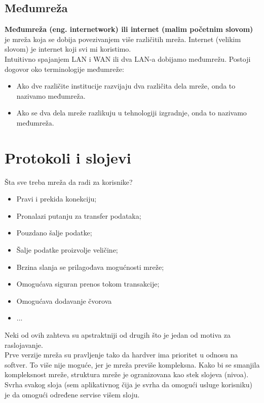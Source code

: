 \documentclass[a4paper]{article}
\begin{document}
    \subsection{Međumreža}
        \textbf{Međumreža (eng. internetwork) ili internet (malim početnim slovom)} je mreža koja
        se dobija povezivanjem više različitih mreža. Internet (velikim slovom) je internet 
        koji svi mi koristimo. \\
        \indent Intuitivno spajanjem LAN i WAN ili dva LAN-a dobijamo međumrežu. 
        Postoji dogovor oko terminologije međumreže:
        \begin{itemize}
            \item Ako dve različite institucije razvijaju dva različita dela mreže, 
                  onda to nazivamo međumreža. 
            \item Ako se dva dela mreže razlikuju u tehnologiji izgradnje, onda to nazivamo međumreža.
        \end{itemize} 

\section{Protokoli i slojevi}
    Šta sve treba mreža da radi za korisnike?
    \begin{itemize}
        \item Pravi i prekida konekciju;
        \item Pronalazi putanju za transfer podataka;
        \item Pouzdano šalje podatke;
        \item Šalje podatke proizvolje veličine;
        \item Brzina slanja se prilagođava mogućnosti mreže;
        \item Omogućava siguran prenos tokom transakcije;
        \item Omogućava dodavanje čvorova
        \item ...
    \end{itemize}
    Neki od ovih zahteva su apstraktniji od drugih što je jedan od motiva za raslojavanje.\\
    \indent Prve verzije mreža su pravljenje tako da hardver ima prioritet u odnosu na softver. 
    To više nije moguće, jer je mreža previše kompleksna. Kako bi se smanjila kompleksnost mreže, 
    struktura mreže je ogranizovana kao stek slojeva (nivoa). Svrha svakog sloja (sem aplikativnog 
    čija je svrha da omogući usluge korisniku) je da omogući određene servise višem sloju.\\
\end{document}
